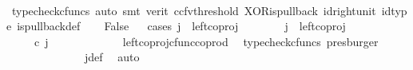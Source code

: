 \begin{isabellebody}
\ \ \ \ \isamarkupfalse%
\ {\isacharparenleft}{\kern0pt}typecheck{\isacharunderscore}{\kern0pt}cfuncs{\isacharcomma}{\kern0pt}\ auto{\isacharcomma}{\kern0pt}\ smt\ {\isacharparenleft}{\kern0pt}verit{\isacharcomma}{\kern0pt}\ ccfv{\isacharunderscore}{\kern0pt}threshold{\isacharparenright}{\kern0pt}\ XOR{\isacharunderscore}{\kern0pt}is{\isacharunderscore}{\kern0pt}pullback\ id{\isacharunderscore}{\kern0pt}right{\isacharunderscore}{\kern0pt}unit{}\ id{\isacharunderscore}{\kern0pt}type\ is{\isacharunderscore}{\kern0pt}pullback{\isacharunderscore}{\kern0pt}def{\isacharparenright}{\kern0pt}\isanewline
\ \ \isamarkupfalse%
\ False\isanewline
\ \ \isamarkupfalse%
{\isacharparenleft}{\kern0pt}cases\ {\isachardoublequoteopen}j\ {\isacharequal}{\kern0pt}\ left{\isacharunderscore}{\kern0pt}coproj\ {\isasymone}\ {\isasymone}{\isachardoublequoteclose}{\isacharparenright}{\kern0pt}\isanewline
\ \ \ \ \isamarkupfalse%
\ {\isachardoublequoteopen}j\ {\isacharequal}{\kern0pt}\ left{\isacharunderscore}{\kern0pt}coproj\ {\isasymone}\ {\isasymone}{\isachardoublequoteclose}\isanewline
\ \ \ \ \isamarkupfalse%
\ \isamarkupfalse%
\ {\isachardoublequoteopen}{\isacharparenleft}{\kern0pt}{\isasymlangle}{\isasymt}{\isacharcomma}{\kern0pt}\ {\isasymf}{\isasymrangle}\ {\isasymamalg}{\isasymlangle}{\isasymf}{\isacharcomma}{\kern0pt}\ {\isasymt}{\isasymrangle}{\isacharparenright}{\kern0pt}\ {\isasymcirc}\isactrlsub c\ j\ \ {\isacharequal}{\kern0pt}\ {\isasymlangle}{\isasymt}{\isacharcomma}{\kern0pt}\ {\isasymf}{\isasymrangle}{\isachardoublequoteclose}\isanewline
\ \ \ \ \ \ \isamarkupfalse%
\ \ left{\isacharunderscore}{\kern0pt}coproj{\isacharunderscore}{\kern0pt}cfunc{\isacharunderscore}{\kern0pt}coprod\ \isamarkupfalse%
\ {\isacharparenleft}{\kern0pt}typecheck{\isacharunderscore}{\kern0pt}cfuncs{\isacharcomma}{\kern0pt}\ presburger{\isacharparenright}{\kern0pt}\isanewline
\ \ \ \ \isamarkupfalse%
\ \isamarkupfalse%
\ {\isachardoublequoteopen}{\isasymlangle}{\isasymt}{\isacharcomma}{\kern0pt}\ {\isasymf}{\isasymrangle}\ {\isacharequal}{\kern0pt}\ {\isasymlangle}{\isasymt}{\isacharcomma}{\kern0pt}{\isasymt}{\isasymrangle}{\isachardoublequoteclose}\isanewline
\ \ \ \ \ \ \isamarkupfalse%
\ j{\isacharunderscore}{\kern0pt}def\ \isamarkupfalse%
\ auto\isanewline
\ \ \ \ \isamarkupfalse%
\ \isamarkupfalse%
\ {\isachardoublequoteopen}{\isasymt}\ {\isacharequal}{\kern0pt}\ {\isasymf}{\isachardoublequoteclose}\isanewline

\end{isabellebody}
